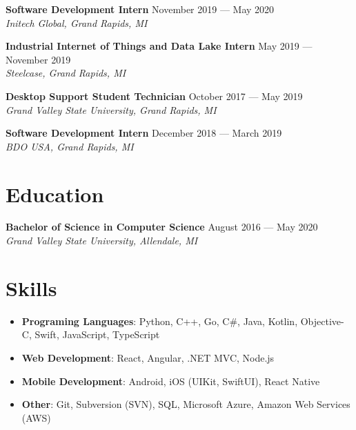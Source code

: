 \documentclass{article}
\begin{document}
\textbf{Software Development Intern} \hfill November 2019 --- May 2020\\
\textit{Initech Global, Grand Rapids, MI}
\medskip


\textbf{Industrial Internet of Things and Data Lake Intern}
\hfill May 2019 --- November 2019\\
\textit{Steelcase, Grand Rapids, MI}
\medskip


\textbf{Desktop Support Student Technician} \hfill October 2017 --- May 2019\\
\textit{Grand Valley State University, Grand Rapids, MI}
\medskip

\textbf{Software Development Intern} \hfill December 2018 --- March 2019\\
\textit{BDO USA, Grand Rapids, MI}
\medskip


\section*{Education}
\textbf{Bachelor of Science in Computer Science} \hfill August 2016 --- May 2020\\
\textit{Grand Valley State University, Allendale, MI}

\section*{Skills}
\begin{itemize}
\item \textbf{Programing Languages}: Python, C++, Go, C\#, Java, Kotlin, Objective-C, Swift, JavaScript, TypeScript
\item \textbf{Web Development}: React, Angular, .NET MVC, Node.js
\item \textbf{Mobile Development}: Android, iOS (UIKit, SwiftUI), React Native
\item \textbf{Other}: Git, Subversion (SVN), SQL, Microsoft Azure, Amazon Web Services (AWS)
\end{itemize}
\end{document}
